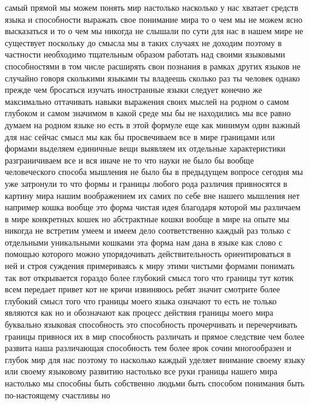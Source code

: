 самый прямой мы можем понять мир настолько насколько у нас хватает средств языка
и способности выражать свое понимание мира то о чем мы не можем ясно высказаться
и то о чем мы никогда не слышали по сути для нас в нашем мире не существует
поскольку до смысла мы в таких случаях не доходим поэтому в частности необходимо
тщательным образом работать над своими языковыми способностями в том числе
расширять свои познания в рамках других языков не случайно говоря сколькими
языками ты владеешь сколько раз ты человек однако прежде чем бросаться изучать
иностранные языки следует конечно же максимально оттачивать навыки выражения
своих мыслей на родном о самом глубоком и самом значимом в какой среде мы бы не
находились мы все равно думаем на родном языке но есть в этой формуле еще как
минимум один важный для нас сейчас смысл мы как бы просвечиваем все в мире
границами или формами выделяем единичные вещи выявляем их отдельные
характеристики разграничиваем все и вся иначе не то что науки не было бы вообще
человеческого способа мышления не было бы в предыдущем вопросе сегодня мы уже
затронули то что формы и границы любого рода различия привносятся в картину мира
нашим воображением их самих по себе вне нашего мышления нет например кошка
вообще это форма чистая идея благодаря которой мы различаем в мире конкретных
кошек но абстрактные кошки вообще в мире на опыте мы никогда не встретим умеем и
имеем дело соответственно каждый раз только с отдельными уникальными кошками эта
форма нам дана в языке как слово с помощью которого можно упорядочивать
действительность ориентироваться в ней и строя суждения примериваясь к миру
этими чистыми формами понимать так вот открывается гораздо более глубокий смысл
того что границы тут котик всем передает привет кот не кричи извиняюсь ребят
значит смотрите более глубокий смысл того что границы моего языка означают то
есть не только являются как но и обозначают как процесс действия границы моего
мира буквально языковая способность это способность прочерчивать и перечерчивать
границы привнося их в мир способность различать и прямое следствие чем более
развита наша различающая способность тем более ярок сочин многообразен и глубок
мир для нас поэтому то насколько каждый уделяет внимание своему языку или своему
языковому развитию настолько все руки границы нашего мира настолько мы способны
быть собственно людьми быть способом понимания быть по-настоящему счастливы но

